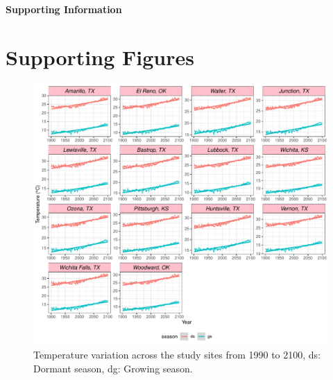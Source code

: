 \documentclass[12pt]{article}
\begin{document}
\newpage


\newpage
\clearpage 
\setcounter{equation}{0}
\setcounter{figure}{0}
\setcounter{section}{0}
\setcounter{table}{0}
\renewcommand{\theequation}{S.\arabic{equation}}
\renewcommand{\thetable}{S-\arabic{table}}
\renewcommand{\thefigure}{S-\arabic{figure}}
\renewcommand{\thesection}{S.\arabic{section}}

\centerline{\Large{\textbf{Supporting Information}}}

\section {Supporting Figures}

\begin{figure}[H]
		\centering
		\includegraphics[width=0.95\linewidth]{Figures/fig_tas_past_present_future.pdf}
		\caption{Temperature variation across the study sites from 1990 to 2100,
		ds: Dormant season, dg: Growing season.}
		\label{Sup:temp_variation}
\end{figure}
\end{document}
